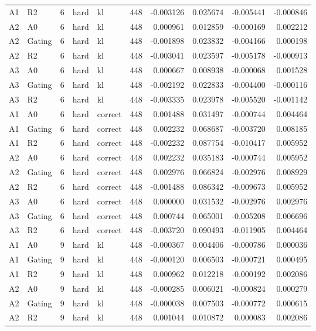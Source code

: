 \begin{tabular}{llrllrrrrr}
A1 & R2 & 6 & hard & kl & 448 & -0.003126 & 0.025674 & -0.005441 & -0.000846 \\
A2 & A0 & 6 & hard & kl & 448 & 0.000961 & 0.012859 & -0.000169 & 0.002212 \\
A2 & Gating & 6 & hard & kl & 448 & -0.001898 & 0.023832 & -0.004166 & 0.000198 \\
A2 & R2 & 6 & hard & kl & 448 & -0.003041 & 0.023597 & -0.005178 & -0.000913 \\
A3 & A0 & 6 & hard & kl & 448 & 0.000667 & 0.008938 & -0.000068 & 0.001528 \\
A3 & Gating & 6 & hard & kl & 448 & -0.002192 & 0.022833 & -0.004400 & -0.000116 \\
A3 & R2 & 6 & hard & kl & 448 & -0.003335 & 0.023978 & -0.005520 & -0.001142 \\
A1 & A0 & 6 & hard & correct & 448 & 0.001488 & 0.031497 & -0.000744 & 0.004464 \\
A1 & Gating & 6 & hard & correct & 448 & 0.002232 & 0.068687 & -0.003720 & 0.008185 \\
A1 & R2 & 6 & hard & correct & 448 & -0.002232 & 0.087754 & -0.010417 & 0.005952 \\
A2 & A0 & 6 & hard & correct & 448 & 0.002232 & 0.035183 & -0.000744 & 0.005952 \\
A2 & Gating & 6 & hard & correct & 448 & 0.002976 & 0.066824 & -0.002976 & 0.008929 \\
A2 & R2 & 6 & hard & correct & 448 & -0.001488 & 0.086342 & -0.009673 & 0.005952 \\
A3 & A0 & 6 & hard & correct & 448 & 0.000000 & 0.031532 & -0.002976 & 0.002976 \\
A3 & Gating & 6 & hard & correct & 448 & 0.000744 & 0.065001 & -0.005208 & 0.006696 \\
A3 & R2 & 6 & hard & correct & 448 & -0.003720 & 0.090493 & -0.011905 & 0.004464 \\
A1 & A0 & 9 & hard & kl & 448 & -0.000367 & 0.004406 & -0.000786 & 0.000036 \\
A1 & Gating & 9 & hard & kl & 448 & -0.000120 & 0.006503 & -0.000721 & 0.000495 \\
A1 & R2 & 9 & hard & kl & 448 & 0.000962 & 0.012218 & -0.000192 & 0.002086 \\
A2 & A0 & 9 & hard & kl & 448 & -0.000285 & 0.006021 & -0.000824 & 0.000279 \\
A2 & Gating & 9 & hard & kl & 448 & -0.000038 & 0.007503 & -0.000772 & 0.000615 \\
A2 & R2 & 9 & hard & kl & 448 & 0.001044 & 0.010872 & 0.000083 & 0.002086 \\

\end{tabular}
